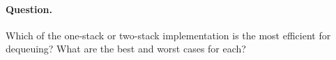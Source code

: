 \paragraph{Question.} Which of the one-stack or two-stack
implementation is the most efficient for dequeuing? What are the best
and worst cases for each?

